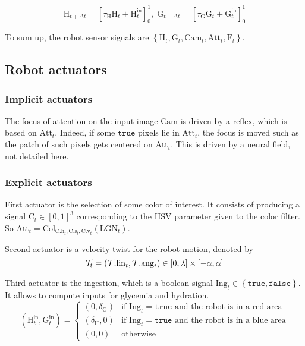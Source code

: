 \documentclass[10pt,a4paper]{article}
\newcommand{\Fx}     [2]{{#1} \left( #2                 \right)}
\newcommand{\True}[0]{\mathtt{true}}
\newcommand{\False}[0]{\mathtt{false}}
\newcommand{\Diff}[1]{{\Delta #1}}
\newcommand{\AttrOf}[2]{{#1}.\mathrm{#2}}
\newcommand{\Pair}[2]{\left({#1},{#2}\right)}
\newcommand{\Set}[1]{\left\{ {#1} \right\}}
\newcommand{\At}[2]{#1_{#2}}
\newcommand{\AtT}[1]{\At{#1}t}
\newcommand{\Sat}[1]{{\left[{#1}\right]}^1_0}
\newcommand{\CamIn}[0]{\mathrm{Cam}}
\newcommand{\LgnIn}[0]{\mathrm{LGN}}
\newcommand{\Attent}[0]{\mathrm{Att}}
\newcommand{\Interest}[0]{\mathrm{C}}
\newcommand{\Focus}[0]{\mathrm{F}}
\newcommand{\Color}[3]{\mathrm{Col}_{#1,#2,#3}}
\newcommand{\Hydro}[0]{\mathrm{H}}
\newcommand{\Glyco}[0]{\mathrm{G}}
\newcommand{\Twist}[0]{{\cal T}}
\newcommand{\Ingest}[0]{\mathrm{Ing}}
\newcommand{\HIngest}[0]{\Hydro^{\mathrm{in}}}
\newcommand{\GIngest}[0]{\Glyco^{\mathrm{in}}}
\newcommand{\Ing}[0]{\delta}
\newcommand{\HIn}[0]{\Ing_\Hydro}
\newcommand{\GIn}[0]{\Ing_\Glyco}
\newcommand{\PhysioDecay}[0]{\tau}
\newcommand{\Linear}{\mathrm{lin}}
\newcommand{\Angular}{\mathrm{ang}}
\newcommand{\AngularMax}[0]{\alpha}
\newcommand{\LinearMax}[0]{\lambda}
\newcommand{\Cart}[0]{\times}
\begin{document}
\begin{equation}
\At \Hydro {t+\Diff t} =  \Sat{\PhysioDecay_\Hydro\AtT\Hydro + \AtT\HIngest}, 
\;\At \Glyco {t+\Diff t} = \Sat{\PhysioDecay_\Glyco\AtT\Glyco + \AtT\GIngest} \label{eq:physio}
\end{equation}

To sum up, the robot sensor signals are $\Set{\AtT\Hydro,\AtT\Glyco,\AtT\CamIn,\AtT\Attent,\AtT\Focus}$.

\subsection{Robot actuators}

\subsubsection{Implicit actuators}

The focus of attention on the input image $\CamIn$ is driven by a reflex, which is based on $\AtT\Attent$. Indeed, if some $\True$ pixels lie in $\AtT\Attent$, the focus is moved such as the patch of such pixels gets centered on $\AtT\Attent$. This is driven by a neural field, not detailed here. 

\subsubsection{Explicit actuators}

First actuator is the selection of some color of interest. It consists of producing a signal $\AtT\Interest \in [0,1]^3$ corresponding to the HSV parameter given to the color filter. 
So $\AtT\Attent = \Fx {\Color {\AtT{\AttrOf\Interest h}}{\AtT{\AttrOf\Interest s}}{\AtT{\AttrOf\Interest v}}}{\AtT\LgnIn}$.

Second actuator is a velocity twist for the robot motion, denoted by 
\[
\AtT\Twist = \Pair {\AtT{\AttrOf\Twist\Linear}}{\AtT{\AttrOf\Twist\Angular}} \in [0,\LinearMax]\Cart[-\AngularMax,\AngularMax]
\]


Third actuator is the ingestion, which is a boolean signal $\AtT \Ingest \in \Set{\True,\False}$. It allows to compute inputs for glycemia and hydration.
\begin{equation}
\Pair{\AtT \HIngest}{\AtT \GIngest} = \left\{\begin{array}{ll}
\Pair 0 \GIn & \mbox{if } \AtT\Ingest = \True \mbox{ and the robot is in a red area} \\
\Pair \HIn 0 & \mbox{if } \AtT\Ingest = \True \mbox{ and the robot is in a blue area} \\
\Pair 00 & \mbox{otherwise}
\end{array}\right.
\end{equation}
\end{document}
